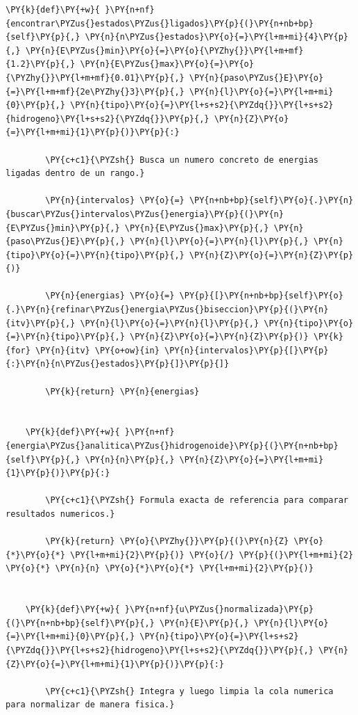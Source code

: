 \documentclass[11pt]{article}
\makeatletter
\def\PY@reset{\let\PY@it=\relax \let\PY@bf=\relax \let\PY@ul=\relax \let\PY@tc=\relax \let\PY@bc=\relax \let\PY@ff=\relax}
\def\PY@tok#1{\csname PY@tok@#1\endcsname}
\def\PY@toks#1+{\ifx\relax#1\empty\else \PY@tok{#1}\expandafter\PY@toks\fi}
\def\PY@do#1{\PY@bc{\PY@tc{\PY@ul{\PY@it{\PY@bf{\PY@ff{#1}}}}}}}
\def\PY#1#2{\PY@reset\PY@toks#1+\relax+\PY@do{#2}}
\makeatother
\begin{document}
\begin{tcolorbox}[breakable, size=fbox, boxrule=1pt, pad at break*=1mm,colback=cellbackground, colframe=cellborder]
\begin{Verbatim}[commandchars=\\\{\}]
    \PY{k}{def}\PY{+w}{ }\PY{n+nf}{encontrar\PYZus{}estados\PYZus{}ligados}\PY{p}{(}\PY{n+nb+bp}{self}\PY{p}{,} \PY{n}{n\PYZus{}estados}\PY{o}{=}\PY{l+m+mi}{4}\PY{p}{,} \PY{n}{E\PYZus{}min}\PY{o}{=}\PY{o}{\PYZhy{}}\PY{l+m+mf}{1.2}\PY{p}{,} \PY{n}{E\PYZus{}max}\PY{o}{=}\PY{o}{\PYZhy{}}\PY{l+m+mf}{0.01}\PY{p}{,} \PY{n}{paso\PYZus{}E}\PY{o}{=}\PY{l+m+mf}{2e\PYZhy{}3}\PY{p}{,} \PY{n}{l}\PY{o}{=}\PY{l+m+mi}{0}\PY{p}{,} \PY{n}{tipo}\PY{o}{=}\PY{l+s+s2}{\PYZdq{}}\PY{l+s+s2}{hidrogeno}\PY{l+s+s2}{\PYZdq{}}\PY{p}{,} \PY{n}{Z}\PY{o}{=}\PY{l+m+mi}{1}\PY{p}{)}\PY{p}{:}

        \PY{c+c1}{\PYZsh{} Busca un numero concreto de energias ligadas dentro de un rango.}

        \PY{n}{intervalos} \PY{o}{=} \PY{n+nb+bp}{self}\PY{o}{.}\PY{n}{buscar\PYZus{}intervalos\PYZus{}energia}\PY{p}{(}\PY{n}{E\PYZus{}min}\PY{p}{,} \PY{n}{E\PYZus{}max}\PY{p}{,} \PY{n}{paso\PYZus{}E}\PY{p}{,} \PY{n}{l}\PY{o}{=}\PY{n}{l}\PY{p}{,} \PY{n}{tipo}\PY{o}{=}\PY{n}{tipo}\PY{p}{,} \PY{n}{Z}\PY{o}{=}\PY{n}{Z}\PY{p}{)}

        \PY{n}{energias} \PY{o}{=} \PY{p}{[}\PY{n+nb+bp}{self}\PY{o}{.}\PY{n}{refinar\PYZus{}energia\PYZus{}biseccion}\PY{p}{(}\PY{n}{itv}\PY{p}{,} \PY{n}{l}\PY{o}{=}\PY{n}{l}\PY{p}{,} \PY{n}{tipo}\PY{o}{=}\PY{n}{tipo}\PY{p}{,} \PY{n}{Z}\PY{o}{=}\PY{n}{Z}\PY{p}{)} \PY{k}{for} \PY{n}{itv} \PY{o+ow}{in} \PY{n}{intervalos}\PY{p}{[}\PY{p}{:}\PY{n}{n\PYZus{}estados}\PY{p}{]}\PY{p}{]}

        \PY{k}{return} \PY{n}{energias}


    \PY{k}{def}\PY{+w}{ }\PY{n+nf}{energia\PYZus{}analitica\PYZus{}hidrogenoide}\PY{p}{(}\PY{n+nb+bp}{self}\PY{p}{,} \PY{n}{n}\PY{p}{,} \PY{n}{Z}\PY{o}{=}\PY{l+m+mi}{1}\PY{p}{)}\PY{p}{:}

        \PY{c+c1}{\PYZsh{} Formula exacta de referencia para comparar resultados numericos.}

        \PY{k}{return} \PY{o}{\PYZhy{}}\PY{p}{(}\PY{n}{Z} \PY{o}{*}\PY{o}{*} \PY{l+m+mi}{2}\PY{p}{)} \PY{o}{/} \PY{p}{(}\PY{l+m+mi}{2} \PY{o}{*} \PY{n}{n} \PY{o}{*}\PY{o}{*} \PY{l+m+mi}{2}\PY{p}{)}


    \PY{k}{def}\PY{+w}{ }\PY{n+nf}{u\PYZus{}normalizada}\PY{p}{(}\PY{n+nb+bp}{self}\PY{p}{,} \PY{n}{E}\PY{p}{,} \PY{n}{l}\PY{o}{=}\PY{l+m+mi}{0}\PY{p}{,} \PY{n}{tipo}\PY{o}{=}\PY{l+s+s2}{\PYZdq{}}\PY{l+s+s2}{hidrogeno}\PY{l+s+s2}{\PYZdq{}}\PY{p}{,} \PY{n}{Z}\PY{o}{=}\PY{l+m+mi}{1}\PY{p}{)}\PY{p}{:}

        \PY{c+c1}{\PYZsh{} Integra y luego limpia la cola numerica para normalizar de manera fisica.}


\end{Verbatim}
\end{tcolorbox}
\end{document}
